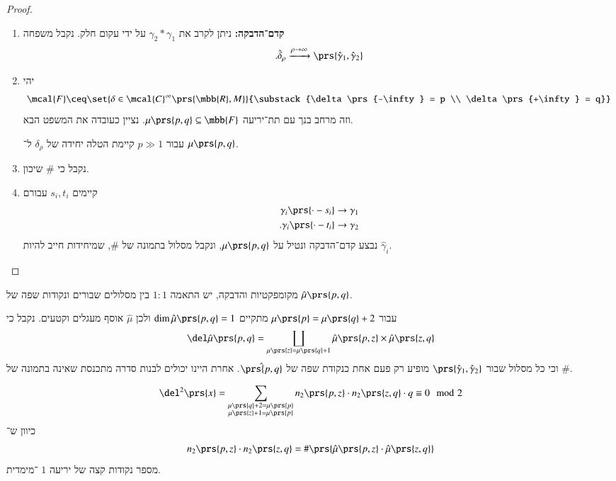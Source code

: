 \documentclass[a4paper,10pt,twoside,openany]{book}
\begin{document}
\begin{proof}
\begin{enumerate}
\item \textbf{קדם־הדבקה:}
ניתן לקרב את
$\gamma_2 * \gamma_1$
על ידי עקום חלק.
נקבל משפחה
\[\text{.} \hat{\delta}_\rho \xrightarrow{\rho \to \infty} \prs{\hat{\gamma}_1, \hat{\gamma}_2}\]

\item
יהי
\[\mcal{F} \ceq \set{\delta \in \mcal{C}^\infty\prs{\mbb{R},M}}{\substack{\delta\prs{-\infty} = p \\ \delta\prs{+\infty} = q}}\]
וזה מרחב בנך עם תת־יריעה
$\mu\prs{p,q} \subseteq \mbb{F}$.
נציין כעובדה את המשפט הבא.

\begin{theorem}
עבור
$p \gg 1$
קיימת הטלה יחידה של
$\delta_\rho$
ל־%
$\mu\prs{p,q}$.
\end{theorem}

\item נקבל כי
$\#$
שיכון.

\item 
קיימים
$s_i, t_i$
עבורם
\begin{align*}
\gamma_i\prs{\cdot - s_i} \to \gamma_1 \\
\text{.} \gamma_i\prs{\cdot - t_i} \to \gamma_2
\end{align*}
נבצע קדם־הדבקה ונטיל על
$\mu\prs{p,q}$,
ונקבל מסלול בתמונה של
$\#$,
שמיחידות חייב להיות
$\hat{\gamma}_i$.
\end{enumerate}
\end{proof}

\begin{corollary}
מקומפקטיות והדבקה, יש התאמה
$1 : 1$
בין מסלולים שבורים ונקודות שפה של
$\hat{\mu}\prs{p,q}$.

עבור
$\mu\prs{p} = \mu\prs{q} + 2$
מתקיים
$\dim \hat{\mu}\prs{p,q} = 1$
ולכן
$\hat{\mu}$
אוסף מעגלים וקטעים.
נקבל כי
\[\del \hat{\mu}\prs{p,q} = \coprod_{\mu\prs{z} = \mu\prs{q} + 1} \hat{\mu}\prs{p,z} \times \hat{\mu}\prs{z,q}\]
וכי כל מסלול שבור
$\prs{\hat{\gamma}_1, \hat{\gamma}_2}$
מופיע רק פעם אחת כנקודת שפה של
$\hat{\prs{p,q}}$.
אחרת היינו יכולים לבנות סדרה מתכנסת שאינה בתמונה של
$\#$.
\end{corollary}

\begin{corollary}
\[\del^2\prs{x} = \sum_{\substack{\mu\prs{q} + 2 = \mu\prs{p} \\ \mu\prs{z} + 1 = \mu\prs{p}}} n_2\prs{p,z} \cdot n_2\prs{z,q} \cdot q \equiv 0 \mod{2}\]
כיוון ש־%
\[n_2\prs{p,z} \cdot n_2\prs{z,q} = \#\prs{\hat{\mu}\prs{p,z} \cdot \hat{\mu}\prs{z,q}}\]
מספר נקודות קצה של יריעה
$1$%
־מימדית.
\end{corollary}
\end{document}
